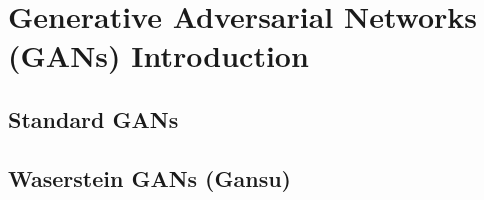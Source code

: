 \chapter{Generative Adversarial Networks (GANs) Introduction}\label{chapter:gans}
\section{Standard GANs}
\section{Waserstein GANs (Gansu)}



